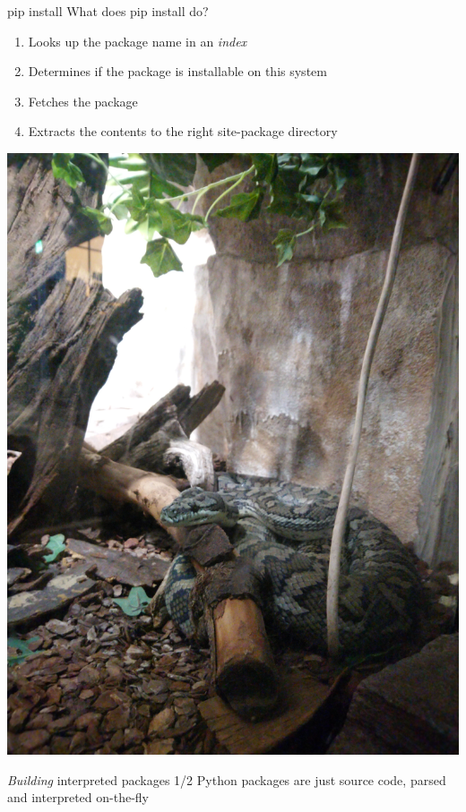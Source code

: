 \documentclass[pdf]{beamer}
\begin{document}
\begin{frame}{pip install}
    What does pip install do?

    \begin{enumerate}
        \item Looks up the package name in an \emph{index}
        \item Determines if the package is installable on this system
        \item Fetches the package
        \item Extracts the contents to the right site-package directory
    \end{enumerate}
\end{frame}

\begin{frame}
    \includegraphics[width=\textwidth]{snake.jpg}
\end{frame}

\begin{frame}{\emph{Building} interpreted packages 1/2}
    Python packages are just source code, parsed and interpreted on-the-fly

\end{frame}
\end{document}
